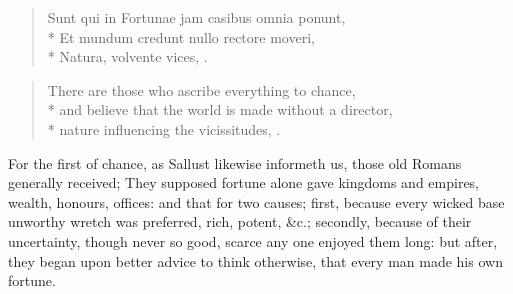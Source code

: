 {\begin{latin}
\begin{verse}
Sunt qui in Fortunae jam casibus omnia ponunt,\\*
Et mundum credunt nullo rectore moveri,\\*
Natura, volvente vices, \etc{}.
\end{verse}
\end{latin}

\begin{verse}
There are those who ascribe everything to chance,\\*
and believe that the world is made without a director,\\*
nature influencing the vicissitudes, \etc{}.
\end{verse}

For the first of chance, as Sallust likewise informeth us, those
old Romans generally received; They supposed fortune alone gave
kingdoms and empires, wealth, honours, offices: and that for two
causes; first, because every wicked base unworthy wretch was preferred,
rich, potent, \&c.; secondly, because of their uncertainty, though never
so good, scarce any one enjoyed them long: but after, they began upon
better advice to think otherwise, that every man made his own fortune.

}
